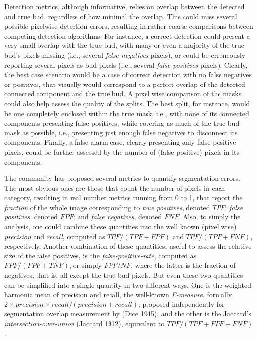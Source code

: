 \documentclass[a4paper,authoryear,review]{elsarticle}
\begin{document}
Detection metrics, although informative, relies on overlap between the detected and true bud, regardless of how minimal the overlap. This could miss several possible pixelwise detection errors, resulting in rather coarse comparisons between competing detection algorithms. For instance, a correct detection could present a very small overlap with the true bud, with many or even a majority of the true bud’s pixels missing (i.e., several \emph{false negatives} pixels), or could be erroneously reporting several pixels as bud pixels (i.e., several \emph{false positives} pixels). Clearly, the best case scenario would be a case of correct detection with no false negatives or positives, that visually would correspond to a perfect overlap of the detected connected component and the true bud.  A pixel wise comparison of the masks could also help assess the quality of the splits. The best split, for instance, would be one completely enclosed within the true mask, i.e., with none of its connected components presenting false positives; while covering as much of the true bud mask as possible, i.e., presenting just enough false negatives to disconnect its components. Finally, a false alarm case, clearly presenting only false positive pixels, could be further assessed by the number of (false positive) pixels in its components. 

The community has proposed several metrics to quantify  segmentation errors. The most obvious ones are those that count the number of pixels in each category, resulting in real number metrics running from 0 to 1, that report the \emph{fraction} of the whole image corresponding to \emph{true positives}, denoted $TPF$; \emph{false positives},  denoted $FPF$;  and \emph{false negatives}, denoted $FNF$. Also, to simply the analysis, one could combine these quantities into the well known (pixel wise) \emph{precision}  and \emph{recall}, computed as $TPF / (TPF + FPF)$  and $TPF / (TPF + FNF)$, respectively. Another combination of these quantities, useful to assess the relative size of the false positives, is the \emph{false-positive-rate}, computed as $FPF/(FPF + TNF)$, or simply $FPF / NF$, where the latter is the fraction of negatives, that is, all except the true bud pixels. But even these two quantities can be simplified into a single quantity in two different ways. One is the weighted harmonic mean of precision and recall, the well-known \emph{F-measure}, formally $2 \times precision \times recall / (precision + recall)$, proposed independently for segmentation overlap measurement by (Dice 1945); and the other is the  Jaccard’s \emph{intersection-over-union} (Jaccard 1912), equivalent to $TPF / (TPF+FPF+FNF)$. 
\end{document}
